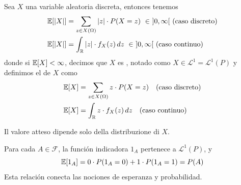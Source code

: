 \begin{definicion}
    Sea $X$ una variable aleatoria discreta, entonces tenemos 
    \begin{align*}
        & \E[|X|]=\sum_{z \in X(\Omega)} |z| \cdot P(X=z) \ \in \ ]0,\infty[ \ \text{(caso discreto)} \\
        & \E[|X|]=\int_{\R} |z| \cdot f_X(z) \, dz \ \in \ ]0,\infty[ \ \text{(caso continuo)}
    \end{align*}
    donde si $\mathbb{E}[X] < \infty$, decimos que $X$ es , notado como $X\in \mathcal{L}^1=\mathcal{L}^1(P)$ y definimos el  de $X$ como
    \begin{align*}
        & \mathbb{E}[X] = \sum_{z \in X(\Omega)} z \cdot P(X=z) \quad  \text{(caso discreto)} \\
        & \mathbb{E}[X] = \int_{\mathbb{R}} z \cdot f_X(z) \, dz \quad \text{(caso continuo)}
    \end{align*}
\end{definicion}

\begin{observacion}
    Il valore atteso dipende solo della distribuzione di $X$.
\end{observacion}

\begin{ejemplo}
    Para cada $A \in \mathcal{F}$, la función indicadora $1_A$ pertenece a $\mathcal{L}^1(P)$, y
    \begin{equation*}
        \mathbb{E}[1_A] = 0 \cdot P(1_A=0) + 1 \cdot P(1_A=1) = P(A)
    \end{equation*}
    Esta relación conecta las nociones de esperanza y probabilidad.
\end{ejemplo}

\begin{ejemplo}
\end{ejemplo}

